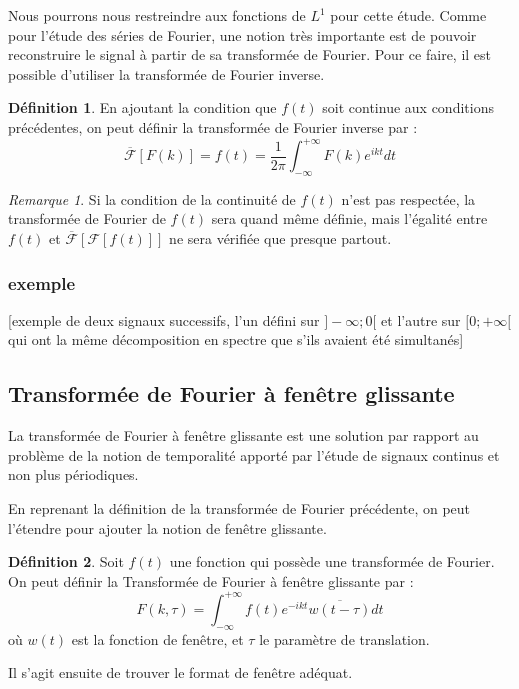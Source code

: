 \documentclass[]{article}
\theoremstyle{remark}
\newtheorem{myrem}{Remarque}
\theoremstyle{definition}
\newtheorem{mydef}{Définition}
\begin{document}
	Nous pourrons nous restreindre aux fonctions de $L^1$ pour cette étude. 
	Comme pour l'étude des séries de Fourier, une notion très importante est de pouvoir reconstruire le signal à partir de sa transformée de Fourier. Pour ce faire, il est possible d'utiliser la transformée de Fourier inverse. 

	\begin{mydef}
		En ajoutant la condition que $f(t)$ soit continue aux conditions précédentes, on peut définir la transformée de Fourier inverse par :
		$$ \overline{\mathcal{F}}[F(k)] = f(t)=\frac{1}{{2\pi}} \int_{-\infty}^{+\infty}F(k)e^{ikt}dt $$ 
	\end{mydef}
	
	\begin{myrem}
		Si la condition de la continuité de $f(t)$ n'est pas respectée, la transformée de Fourier de $f(t)$ sera quand même définie, mais l'égalité entre $f(t)$ et $\overline{\mathcal{F}}[\mathcal{F}[f(t)]]$ ne sera vérifiée que presque partout. 
	\end{myrem}
			
	\subsubsection{exemple}
	[exemple de deux signaux successifs, l'un défini sur $ ] -\infty; 0[$ et l'autre sur $ [0; +\infty[$ qui ont la même décomposition en spectre que s'ils avaient été simultanés]
	
	\subsection{Transformée de Fourier à fenêtre glissante}
	La transformée de Fourier à fenêtre glissante est une solution par rapport au problème de la notion de temporalité apporté par l'étude de signaux continus et non plus périodiques. 

	En reprenant la définition de la transformée de Fourier précédente, on peut l'étendre pour ajouter la notion de fenêtre glissante. 
		
	\begin{mydef}
		Soit $f(t)$ une fonction qui possède une transformée de Fourier. On peut définir la Transformée de Fourier à fenêtre glissante par :
		$$ F(k, \tau)= \int_{-\infty}^{+\infty}f(t)e^{-ikt} \overline{w(t - \tau)}dt$$
		où $w(t)$ est la fonction de fenêtre, et $\tau$ le paramètre de translation. 
	\end{mydef}
	Il s'agit ensuite de trouver le format de fenêtre adéquat. 
	
\end{document}
